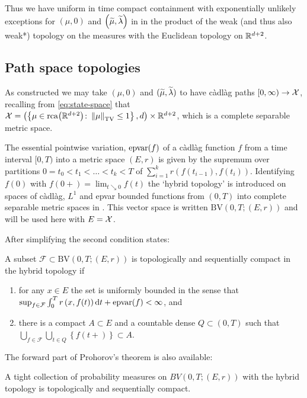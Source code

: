 Thus we have uniform in time compact containment with exponentially unlikely exceptions for $(\mu, 0)$ and $\left(\widetilde{\mu}, \widetilde{\lambda}\right)$ in
\sX in the product of the weak (and thus also weak*) topology on the measures with the Euclidean topology on $\mathbb{R}^{d+2}$.



\subsection{Path space topologies}

As constructed we may take $(\mu, 0)$ and $(\widetilde{\mu}, \widetilde{\lambda})$ to have c\`adl\`ag paths $[0,\infty) \rightarrow \mathcal{X}$, recalling from \eqref{eq:state-space} that
$\mathcal{X} =\left(\left\{\mu \in \mathrm{rca}{\left({\mathbb{R}^{d+2}}\right)} \colon \left\lVert{\mu}\right\rVert_\mathrm{TV} \leq 1 \right\}, d\right)\times \mathbb{R}^{d+2}$, which is a complete separable metric space.

The essential pointwise variation, $\mathrm{epvar}{\left({f}\right)}$ of a c\`adl\`ag function $f$ from a time interval $[0,T)$ into a metric space $(E,r)$ is given by the supremum over partitions
$0=t_0 < t_1 < \dots < t_k < T$ of $\sum_{i=1}^k r\left(f(t_{i-1}),f(t_{i})\right)$.
Identifying $f(0)$ with $f(0+) = \lim_{t \searrow 0} f(t)$ the `hybrid topology' is introduced on spaces of c\`adl\`ag, $L^1$ and epvar bounded functions from $(0,T)$ into complete separable metric spaces in \cite{HPR16}.  This vector space is written $\mathrm{BV}\left(0,T; (E,r)\right) $ and will be used here with $E=\mathcal{X}$.


After simplifying the second condition \cite[Theorem 3.18]{HPR16} states:
\begin{theorem}
A subset $\mathcal{F} \subset \mathrm{BV}\left(0,T; \left(E,r\right)\right)$ is topologically and sequentially compact in the hybrid topology if
\begin{enumerate}
    \item for any $x \in E$ the set is uniformly bounded in the sense that
    $\sup_{f\in\mathcal{F}} \int_0^T r\left(x, f(t)\right)\mathrm{d} t + \mathrm{epvar}{\left({f}\right)} < \infty$, and
    \item there is a compact $A \subset E$ and a countable dense
    $Q \subset (0,T)$ such that $\bigcup_{f\in\mathcal{F}} \bigcup_{t\in Q} \left\{f(t+) \right\} \subset A$.
\end{enumerate}
\end{theorem}

The forward part of Prohorov's theorem is also available:
\begin{proposition}
A tight collection of probability measures 
on $BV\left(0,T;(E,r)\right)$ with the hybrid topology is topologically and sequentially compact.
\end{proposition}


